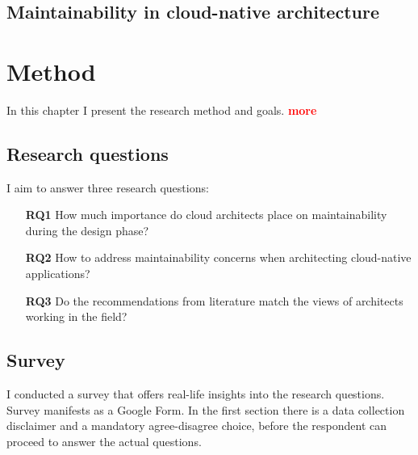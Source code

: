 \documentclass[utf8,english]{gradu3}
\newcommand{\todo}[1]{\textbf{\textcolor{red}{#1}}}
\begin{document}
\section{Maintainability in cloud-native architecture}

\chapter{Method}

In this chapter I present the research method and goals. \todo{more}

\section{Research questions}

I aim to answer three research questions:
\begin{itemize}
  \item [\textbf{RQ1}] How much importance do cloud architects place on maintainability during
        the design phase?
  \item [\textbf{RQ2}] How to address maintainability concerns when architecting cloud-native
        applications?
  \item [\textbf{RQ3}] Do the recommendations from literature match the views of architects
        working in the field?
\end{itemize}


\section{Survey}

I conducted a survey that offers real-life insights into the research questions.
Survey manifests as a Google Form.
In the first section there is a data collection disclaimer and a mandatory agree-disagree choice,
before the respondent can proceed to answer the actual questions.
\end{document}
